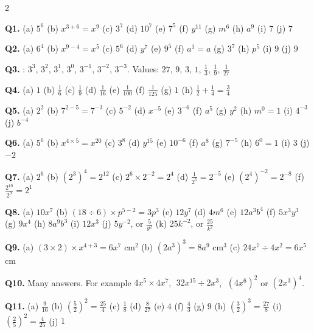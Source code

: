 \documentclass[12pt,a4paper]{article}
\newcommand{\ealtext}[1]{\foreignlanguage{polish}{#1}}
\newlength{\ealglosswd}
\newlength{\ealglossraise}
\newcommand{\ealkey}[1]{\textcolor{ealkeycolour}{#1}}
\newcommand{\ealgloss}[2]{%
  \sbox{\ealboxen}{\ealkey{#1}}%
  \sbox{\ealboxtr}{\small\textcolor{ealtwocolour}{\ealtext{#2}}}%
  \setlength{\ealglosswd}{\wd\ealboxen}%
  \ifdim\wd\ealboxtr>\ealglosswd\setlength{\ealglosswd}{\wd\ealboxtr}\fi
  \leavevmode
  \makebox[\ealglosswd][c]{%
    \makebox[0pt][c]{\usebox{\ealboxen}}%
    \makebox[0pt][c]{\raisebox{\ealglossraise}{\usebox{\ealboxtr}}}%
  }%
}
\newenvironment{ealglossed}{\par\linespread{2.1}\selectfont\ignorespaces}{\par}
\begin{document}
{\small
\begin{multicols}{2}
\raggedcolumns
\setlength{\parskip}{4pt}

\textbf{Q1.} (a) $5^6$ \quad (b) $x^{3+6}=x^9$ \quad (c) $3^7$ \quad
(d) $10^7$ \quad (e) $7^5$ \quad (f) $y^{11}$ \quad (g) $m^6$ \quad
(h) $a^9$ \quad (i) $7$ \quad (j) $7$

\textbf{Q2.} (a) $6^4$ \quad (b) $x^{9-4}=x^5$ \quad (c) $5^6$ \quad
(d) $y^7$ \quad (e) $9^5$ \quad (f) $a^1=a$ \quad (g) $3^7$ \quad (h) $p^5$
\quad (i) $9$ \quad (j) $9$

\begin{ealglossed}
\textbf{Q3.} \ealgloss{Powers}{Potęgi}: $3^3$, $3^2$, $3^1$, $3^0$, $3^{-1}$, $3^{-2}$, $3^{-3}$.
Values: $27$, $9$, $3$, $1$, $\frac13$, $\frac19$, $\frac1{27}$
\end{ealglossed}

\textbf{Q4.} (a) $1$ \quad (b) $\frac16$ \quad (c) $\frac19$ \quad
(d) $\frac1{16}$ \quad (e) $\frac1{100}$ \quad (f) $\frac1{125}$ \quad
(g) $1$ \quad (h) $\frac12+\frac14=\frac34$

\textbf{Q5.} (a) $2^2$ \quad (b) $7^{2-5}=7^{-3}$ \quad (c) $5^{-2}$ \quad
(d) $x^{-5}$ \quad (e) $3^{-6}$ \quad (f) $a^5$ \quad (g) $y^2$ \quad
(h) $m^0=1$ \quad (i) $4^{-3}$ \quad (j) $b^{-4}$

\textbf{Q6.} (a) $5^6$ \quad (b) $x^{4\times5}=x^{20}$ \quad (c) $3^8$ \quad
(d) $y^{15}$ \quad (e) $10^{-6}$ \quad (f) $a^8$ \quad (g) $7^{-5}$ \quad
(h) $6^0=1$ \quad (i) $3$ \quad (j) $-2$

\textbf{Q7.} (a) $2^6$ \quad (b) $(2^3)^4=2^{12}$ \quad
(c) $2^6\times2^{-2}=2^4$ \quad (d) $\frac1{2^5}=2^{-5}$ \quad
(e) $(2^4)^{-2}=2^{-8}$ \quad (f) $\frac{2^{10}}{2^9}=2^1$

\textbf{Q8.} (a) $10x^7$ \quad (b) $(18\div6)\times p^{5-2}=3p^3$ \quad
(c) $12y^7$ \quad (d) $4m^6$ \quad (e) $12a^3b^4$ \quad (f) $5x^3y^3$ \quad
(g) $9x^4$ \quad (h) $8a^9b^3$ \quad (i) $12x^3$ \quad
(j) $5y^{-2}$, or $\frac{5}{y^2}$ \quad (k) $25k^{-2}$, or $\frac{25}{k^2}$

\textbf{Q9.} (a) $(3\times2)\times x^{4+3}=6x^7$ cm$^2$ \quad
(b) $(2a^3)^3=8a^9$ cm$^3$ \quad (c) $24x^7\div4x^2=6x^5$ cm

\textbf{Q10.} Many answers. For example $4x^5\times4x^7$,
$\;32x^{15}\div2x^3$, $\;(4x^6)^2$ or $(2x^3)^4$.

\textbf{Q11.} (a) $\frac{9}{16}$ \quad (b) $\left(\frac52\right)^2=\frac{25}{4}$
\quad (c) $\frac18$ \quad (d) $\frac{8}{27}$ \quad (e) $4$ \quad
(f) $\frac43$ \quad (g) $9$ \quad (h) $\left(\frac32\right)^3=\frac{27}{8}$
\quad (i) $\left(\frac25\right)^2=\frac{4}{25}$ \quad (j) $1$


\end{multicols}}
\end{document}
